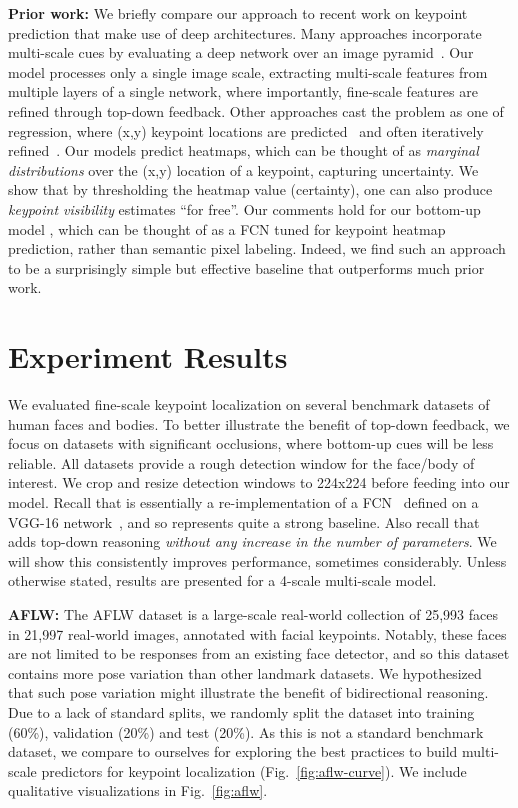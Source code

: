 \documentclass[10pt,twocolumn,letterpaper]{article}
\newcommand{\QP}[1]{{}}
\begin{document}
{\bf Prior work:} We briefly compare our approach to recent work on
keypoint prediction that make use of deep architectures.  Many
approaches incorporate multi-scale cues by evaluating a deep network
over an image pyramid~\cite{tulsiani2014viewpoints,
  tompson2014efficient, tompson2014joint}. Our model processes only a
single image scale, extracting multi-scale features from multiple
layers of a single network, where importantly, fine-scale features are
refined through top-down feedback. Other approaches cast the problem
as one of regression, where (x,y) keypoint locations are
predicted~\cite{zhang2014facial} and often iteratively
refined~\cite{carreira2015human,sun2013deep}. Our models predict
heatmaps, which can be thought of as {\em marginal distributions} over
the (x,y) location of a keypoint, capturing uncertainty. We show that
by thresholding the heatmap value (certainty), one can also produce
{\em keypoint visibility} estimates ``for free''. Our comments hold
for our bottom-up model \QP{1}, which can be thought of as a FCN tuned
for keypoint heatmap prediction, rather than semantic pixel
labeling. Indeed, we find such an approach to be a surprisingly simple
but effective baseline that outperforms much prior work.

\section{Experiment Results}

We evaluated fine-scale keypoint localization on several benchmark
datasets of human faces and bodies. To better illustrate the benefit
of top-down feedback, we focus on datasets with significant
occlusions, where bottom-up cues will be less reliable. All datasets
provide a rough detection window for the face/body of interest. We
crop and resize detection windows to 224x224 before feeding into our
model. Recall that \QP{1} is essentially a re-implementation of a
FCN~\cite{long2014fully} defined on a VGG-16
network~\cite{simonyan2014very}, and so represents quite a strong
baseline.  Also recall that \QP{2} adds top-down reasoning {\em
  without any increase in the number of parameters}. We will show this
consistently improves performance, sometimes considerably.  Unless
otherwise stated, results are presented for a 4-scale multi-scale
model. 


{\bf AFLW:} The AFLW dataset \cite{kostinger2011annotated} is a
large-scale real-world collection of 25,993 faces in 21,997 real-world
images, annotated with facial keypoints. Notably, these faces are not
limited to be responses from an existing face detector, and so this
dataset contains more pose variation than other landmark datasets. We
hypothesized that such pose variation might illustrate the benefit of
bidirectional reasoning. Due to a lack of standard splits, we randomly
split the dataset into training (60\%), validation (20\%) and test
(20\%). As this is not a standard benchmark dataset, we compare to ourselves
for exploring the best practices to build multi-scale predictors for
keypoint localization (Fig.~\ref{fig:aflw-curve}). We include qualitative visualizations in Fig.~\ref{fig:aflw}.
\end{document}
